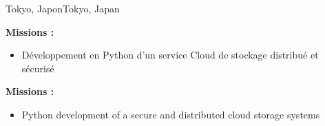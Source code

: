 {}{}{\ifnativelang Tokyo, Japon\else Tokyo, Japan\fi}{
\ifnativelang
	\textcolor{color1}{\textbf{Missions :}}
	\begin{itemize}[leftmargin=\ListItemsMargins]
		\item D\'eveloppement en Python d'un service Cloud de stockage distribu\'e et s\'ecuris\'e
	\end{itemize}
\else
	\textcolor{color1}{\textbf{Missions :}}
	\begin{itemize}[leftmargin=\ListItemsMargins]
		\item Python development of a secure and distributed cloud storage systems
	\end{itemize}
\fi
}

\vspace{\ItemsMaxSpacing}

